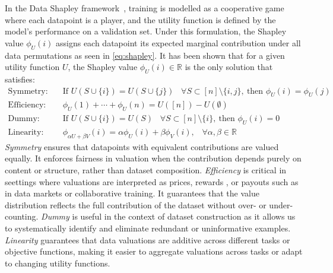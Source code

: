 \documentclass{article}
\def\R{\mathbb{R}}
\newcommand{\1}{\mathbbm{1}}
\begin{document}
In the Data Shapley framework~\cite{ghorbani2019data}, training is modelled as a cooperative game where each datapoint is a player, and the utility function is defined by the model's performance on a validation set.
%
Under this formulation, the Shapley value $\phi_U(i)$ assigns each datapoint its expected marginal contribution under all data permutations as seen in \eqref{eq:shapley}.
%
It has been shown that for a given utility function $U$, the Shapley value $\phi_U(i) \in \R$ is the only solution that satisfies:
%
\begin{align}
    \text{Symmetry:} \quad & \text{If } U(S \cup \{i\}) = U(S \cup \{j\}) \;\;\; \forall S \subset [n] \setminus \{i, j\},\ \text{then } \phi_U(i) = \phi_U(j) \label{eq:symmetry}\\
    \text{Efficiency:} \quad & \phi_U(1) + \cdots + \phi_U(n) = U([n]) - U(\emptyset) \label{eq:efficiency}\\
    \text{Dummy:} \quad & \text{If } U(S \cup \{i\}) = U(S) \;\;\;\forall S \subset [n] \setminus \{i\},\ \text{then } \phi_U(i) = 0 \label{eq:dummy}\\
    \text{Linearity:} \quad & \phi_{\alpha U + \beta V}(i) = \alpha \phi_U(i) + \beta \phi_V(i),\;\;\; \forall \alpha, \beta \in \mathbb{R} \label{eq:linearity}
\end{align}
%
\emph{Symmetry} ensures that datapoints with equivalent contributions are valued equally. It enforces fairness in valuation when the contribution depends purely on content or structure, rather than dataset composition.
%
\emph{Efficiency} is critical in seettings where valuations are interpreted as prices, rewards , or payouts such as in data markets or collaborative training.
%
It guarantees that the value distribution reflects the full contribution of the dataset without over- or under-counting.
%
\emph{Dummy} is useful in the context of dataset construction as it allows us to systematically identify and eliminate redundant or uninformative examples.
%
\emph{Linearity} guarantees that data valuations are additive across different tasks or objective functions, making it easier to aggregate valuations across tasks or adapt to changing utility functions.
\end{document}
